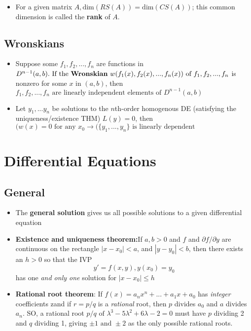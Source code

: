 \documentclass[10pt,letterpaper]{article}
\begin{document}
\begin{itemize}
\item For a given matrix $A, \mbox{dim}(RS(A)) = \mbox{dim}(CS(A))$; this common dimension is called the \textbf{rank} of $A$. 

\end{itemize}

\subsection*{Wronskians} %

\begin{itemize}
\item Suppose some $f_1, f_2,...,f_n$ are functions in $D^{n-1}(a,b).\mbox{ If the \textbf{Wronskian} }w(f_1(x),f_2(x),...,f_n(x)) \mbox{ of } f_1,f_2,...,f_n$
is nonzero for some $x$ in $(a,b)$, then $f_1, f_2, ...,f_n \mbox{ are linearly independent elements of }D^{n-1}(a,b)$

\item Let $y_1,...y_n$ be solutions to the $n$th-order homogenous DE (satisfying the uniqueness/existence THM)
$L(y)=0$, then 
$(w(x)=0 \mbox{ for any }x_0\rightarrow (\{y_1,...,y_n\}\mbox{ is linearly dependent }$


\end{itemize}


\section*{Differential Equations}

\subsection*{General}
\begin{itemize}

\item The \textbf{general solution} gives us all possible solutions to a given differential equation

\item \textbf{Existence and uniqueness theorem:}If $a,b>0$ and $f$ and $\partial f/\partial y$ are continuous on the rectangle $|x-x_0|<a$, 
and $|y-y_0|<b$, then there exists an $h>0$ so that the IVP 
$$y'=f(x,y), y(x_0)=y_0$$
has one \textit{and only one} solution for $|x-x_0|\leq h$

\item \textbf{Rational root theorem}: If $f(x)=a_nx^n+...+a_1x+a_0$ has \textit{integer} coefficients zand if $r=p/q$ is a \textit{rational} root, then $p$ divides $a_0$ and $a$ divides $a_n$. SO, a rational root $p/q\mbox{ of }\lambda^3-5\lambda^2+6\lambda-2=0$ must have $p$ dividing 2 and $q$ dividing 1, giving $\pm 1\mbox{ and } \pm 2$ as the only possible rational roots. 

\end{itemize}
\end{document}
